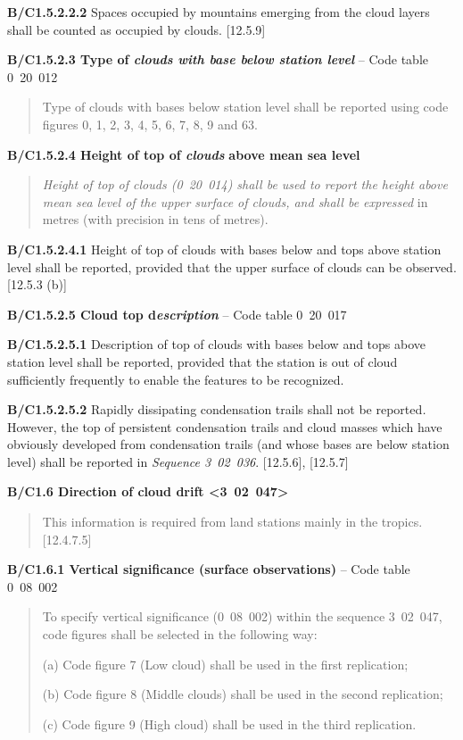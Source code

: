 \textbf{B/C1.5.2.2.2} Spaces occupied by mountains emerging from the cloud layers shall be counted as occupied by clouds. {[}12.5.9{]}

\textbf{B/C1.5.2.3 Type of \emph{clouds with base below station level}} -- Code table 0\emph{~}20\emph{~}012

\begin{quote}
Type of clouds with bases below station level shall be reported using code figures 0, 1, 2, 3, 4, 5, 6, 7, 8, 9 and 63.
\end{quote}

\textbf{B/C1.5.2.4 Height of top of \emph{clouds}} \textbf{above mean sea level}

\begin{quote}
\emph{Height of top of clouds (0~20~014) shall be used to report the height above mean sea level of the upper surface of clouds, and shall be expressed} in metres (with precision in tens of metres).
\end{quote}

\textbf{B/C1.5.2.4.1} Height of top of clouds with bases below and tops above station level shall be reported, provided that the upper surface of clouds can be observed. {[}12.5.3 (b){]}

\textbf{B/C1.5.2.5 Cloud top d\emph{escription }}-- Code table 0\emph{~}20\emph{~}017

\textbf{B/C1.5.2.5.1} Description of top of clouds with bases below and tops above station level shall be reported, provided that the station is out of cloud sufficiently frequently to enable the features to be recognized.

\textbf{B/C1.5.2.5.2} Rapidly dissipating condensation trails shall not be reported\emph{.} However, the top of persistent condensation trails and cloud masses which have obviously developed from condensation trails (and whose bases are below station level) shall be reported in \emph{Sequence 3~02~036}. {[}12.5.6{]}, {[}12.5.7{]}

\textbf{B/C1.6 Direction of cloud drift \textless3~02~047\textgreater{}}

\begin{quote}
This information is required from land stations mainly in the tropics. {[}12.4.7.5{]}
\end{quote}

\textbf{B/C1.6.1 Vertical significance (surface observations)} -- Code table 0\emph{~}08\emph{~}002

\begin{quote}
To specify vertical significance (0~08~002) within the sequence 3~02~047, code figures shall be selected in the following way:

(a) Code figure 7 (Low cloud) shall be used in the first replication;

(b) Code figure 8 (Middle clouds) shall be used in the second replication;

(c) Code figure 9 (High cloud) shall be used in the third replication.
\end{quote}

